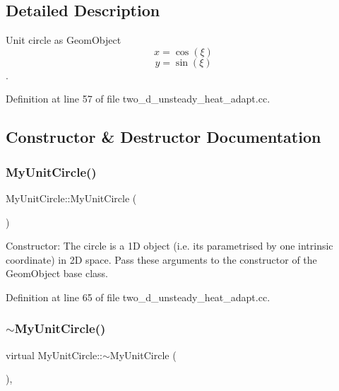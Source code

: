 \subsection{Detailed Description}
Unit circle as Geom\+Object \[ x = \cos(\xi) \] \[ y = \sin(\xi) \]. 

Definition at line 57 of file two\+\_\+d\+\_\+unsteady\+\_\+heat\+\_\+adapt.\+cc.



\subsection{Constructor \& Destructor Documentation}
\mbox{\label{classMyUnitCircle_a056add64776e52a8ea2ba2e9d6d0e32d}} 
\subsubsection{\texorpdfstring{My\+Unit\+Circle()}{MyUnitCircle()}}
{\footnotesize\ttfamily My\+Unit\+Circle\+::\+My\+Unit\+Circle (\begin{DoxyParamCaption}{ }\end{DoxyParamCaption})\hspace{0.3cm}{\ttfamily [inline]}}



Constructor\+: The circle is a 1D object (i.\+e. it\textquotesingle{}s parametrised by one intrinsic coordinate) in 2D space. Pass these arguments to the constructor of the Geom\+Object base class. 



Definition at line 65 of file two\+\_\+d\+\_\+unsteady\+\_\+heat\+\_\+adapt.\+cc.

\mbox{\label{classMyUnitCircle_ae6b321a25ef6f6b12d7c9a225f91140d}} 
\subsubsection{\texorpdfstring{$\sim$\+My\+Unit\+Circle()}{~MyUnitCircle()}}
{\footnotesize\ttfamily virtual My\+Unit\+Circle\+::$\sim$\+My\+Unit\+Circle (\begin{DoxyParamCaption}{ }\end{DoxyParamCaption})\hspace{0.3cm}{\ttfamily [inline]}, {\ttfamily [virtual]}}



